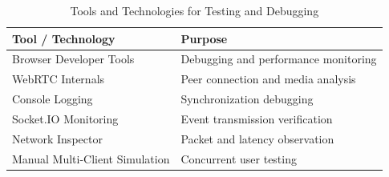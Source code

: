 \documentclass[12pt]{article}
\begin{document}
\begin{table}[h!]
\centering
\renewcommand{\arraystretch}{1.5}

\begin{tabular}{|p{6cm}|p{8cm}|}
\hline
\textbf{Tool / Technology} & \textbf{Purpose} \\ 
\hline

Browser Developer Tools & Debugging and performance monitoring \\ 
\hline

WebRTC Internals & Peer connection and media analysis \\ 
\hline

Console Logging & Synchronization debugging \\ 
\hline

Socket.IO Monitoring & Event transmission verification \\ 
\hline

Network Inspector & Packet and latency observation \\ 
\hline

Manual Multi-Client Simulation & Concurrent user testing \\ 
\hline

\end{tabular}
\caption{Tools and Technologies for Testing and Debugging}

\end{table}
\end{document}
